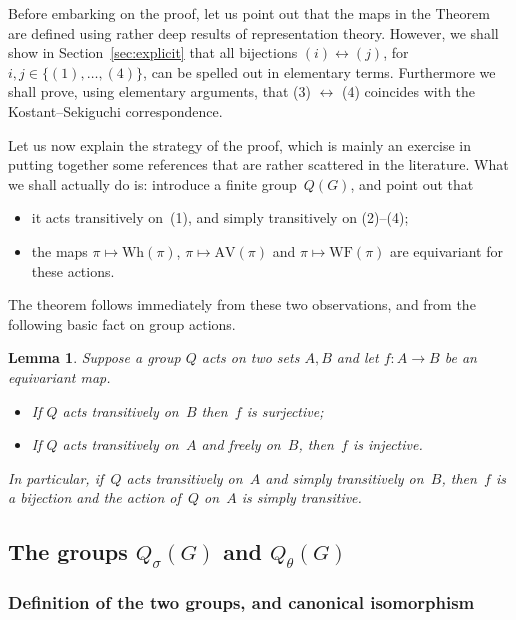 \documentclass[10pt,leqno]{article}
\newtheorem{lemma}[equation]{Lemma}
\newcommand{\AV}{\mathrm{AV}}
\newcommand{\Wh}{\mathrm{Wh}}
\newcommand{\WF}{\mathrm{WF}}
\begin{document}
Before embarking on the proof, let us point out that the maps in the Theorem are defined using rather deep results of representation theory. However, we shall show in Section~\ref{sec:explicit} that all bijections $(i) \leftrightarrow (j)$, for $i,j \in \{(1), \dots, (4)\}$, can be spelled out in elementary terms. Furthermore we shall prove, using elementary arguments, that (3) $\leftrightarrow$ (4) coincides with the Kostant--Sekiguchi correspondence.  



Let us now explain the strategy of the proof, which is mainly an exercise in putting together some references that are rather scattered in the literature. What we shall actually do is: introduce a finite group~$Q(G)$, and point out that 
\begin{itemize}
\item[(i)] it acts transitively on~(1), and simply transitively on (2)--(4);
\item[(ii)] the maps $\pi \mapsto \Wh(\pi)$, $\pi \mapsto \AV(\pi)$ and $\pi\mapsto \WF(\pi)$  are equivariant for these actions.
\end{itemize}
The theorem follows immediately from these two observations, and from the following basic fact on group actions.

\begin{lemma} Suppose a group $Q$ acts on two sets $A, B$ and let $f\colon A \to B$ be an equivariant map. 
\begin{itemize}
\item[(a)] If $Q$ acts transitively on~$B$  then~$f$ is surjective;
\item[(b)] If $Q$ acts transitively on~$A$ and freely on~$B$, then~$f$ is injective.
\end{itemize}
In particular, if~$Q$ acts transitively on~$A$ and simply transitively on~$B$, then~$f$ is a bijection and the action of~$Q$ on~$A$ is simply transitive.
\end{lemma}

\subsection{The groups $Q_\sigma(G)$ and $Q_{\theta}(G)$}

\subsubsection{Definition of the two groups, and canonical isomorphism}
\end{document}
